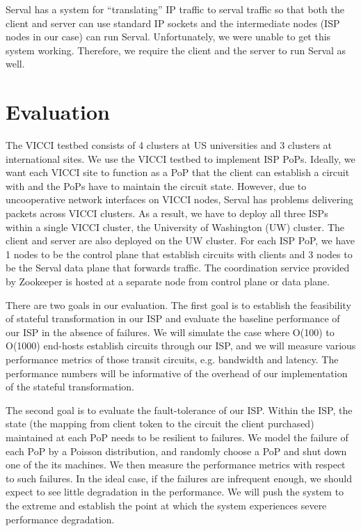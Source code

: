 \documentclass{article}
\begin{document}
Serval has a system for ``translating'' IP traffic to serval traffic
so that both the client and server can use standard IP sockets and the
intermediate nodes (ISP nodes in our case) can run
Serval. Unfortunately, we were unable to get this system
working. Therefore, we require the client and the server to run Serval
as well.

\section{Evaluation}

The VICCI testbed consists of 4 clusters at US universities and 3
clusters at international sites. We use the VICCI testbed to
implement ISP PoPs.
Ideally, we want each VICCI site to function
as a PoP that the client can establish a circuit with and the PoPs
have to maintain the circuit state.
However, due to uncooperative network interfaces on VICCI nodes,
Serval has problems delivering packets across VICCI clusters.
As a result, we have to deploy all three ISPs within a single VICCI cluster,
 the University of Washington (UW) cluster. The client and server are also deployed
 on the UW cluster.
For each ISP PoP, we have
1 nodes to be the control plane that establish circuits with clients
and 3 nodes to be the Serval data plane that forwards
traffic. The coordination service provided by Zookeeper is hosted
at a separate node from control plane or data plane.

There are two goals in our evaluation. The first goal is to establish
the feasibility of stateful transformation in our ISP and evaluate the
baseline performance of our ISP in the absence of failures. We will
simulate the case where O(100) to O(1000) end-hosts establish circuits
through our ISP, and we will measure various performance metrics of
those transit circuits, e.g. bandwidth and latency. The performance
numbers will be informative of the overhead of our implementation of
the stateful transformation.

The second goal is to evaluate the fault-tolerance of our ISP. Within
the ISP, the state (the mapping from client token to the circuit the
client purchased) maintained at each PoP needs to be resilient to
failures. We model the failure of each PoP by a Poisson distribution,
and randomly choose a PoP and shut down one of the its machines. We
then measure the performance metrics with respect to such failures. In
the ideal case, if the failures are infrequent enough, we should
expect to see little degradation in the performance. We will push the
system to the extreme and establish the point at which the system
experiences severe performance degradation.
\end{document}
